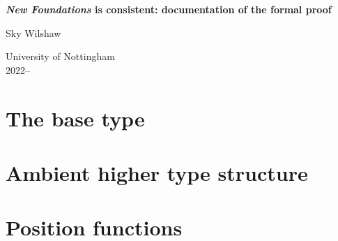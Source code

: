 \documentclass{book}
\begin{document}

\begin{titlepage}
	\begin{center}
		\vspace*{1cm}

		\Huge
		\textbf{\emph{New Foundations} is consistent: documentation of the formal proof}

		\vspace{0.5cm}
		\LARGE
		Sky Wilshaw

		\vfill

		\Large
		University of Nottingham\\
		2022--\the\year{}

	\end{center}
\end{titlepage}

\dominitoc{}

\setcounter{tocdepth}{1}
\tableofcontents
\newpage
\setcounter{tocdepth}{3}

\chapter{The base type}

\minitoc









\chapter{Ambient higher type structure}

\minitoc






\chapter{Position functions}

\minitoc




\end{document}
